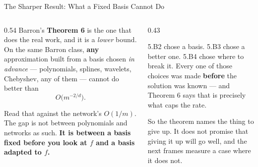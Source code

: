 \begin{frame}{The Sharper Result: What a Fixed Basis Cannot Do}
\begin{columns}[T]
\begin{column}{0.54\textwidth}
\small
Barron's \textbf{Theorem 6} is the one that does the real work, and it is a \emph{lower} bound. On the same Barron class, \textbf{any} approximation built from a basis chosen \emph{in advance} --- polynomials, splines, wavelets, Chebyshev, any of them --- cannot do better than
\[
  O\bigl(m^{-2/d}\bigr).
\]
\medskip

Read that against the network's $O(1/m)$. The gap is not between polynomials and networks as such. \textbf{It is between a basis fixed before you look at $f$ and a basis adapted to $f$.}
\end{column}
\begin{column}{0.43\textwidth}
\begin{takeawaybox}[title=\textbf{The through-line of this course}]\small
5.B2 chose a basis. 5.B3 chose a better one. 5.B4 chose where to break it.
\medskip
Every one of those choices was made \textbf{before} the solution was known --- and Theorem 6 says that is precisely what caps the rate.
\end{takeawaybox}
\medskip
\begin{examplebox}\footnotesize
So the theorem names the thing to give up. It does not promise that giving it up will go well, and the next frames measure a case where it does not.
\end{examplebox}
\end{column}
\end{columns}
\vspace{1mm}
\end{frame}

